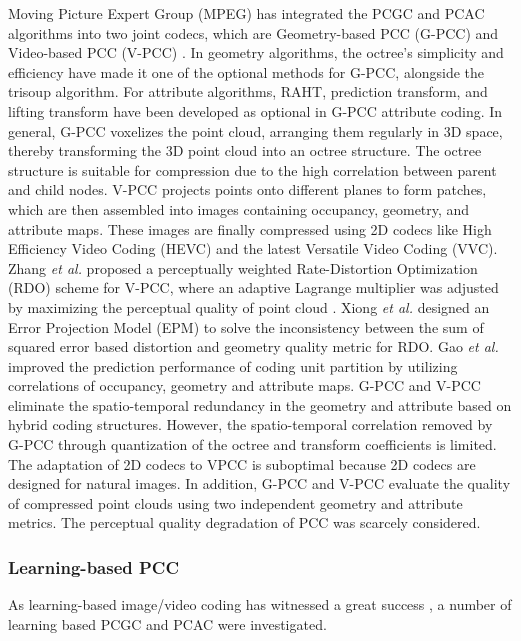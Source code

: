 Moving Picture Expert Group (MPEG) has integrated the PCGC and PCAC algorithms into two joint codecs, which are Geometry-based PCC (G-PCC) \cite{mammou2019g} and Video-based PCC (V-PCC) \cite{mammou2017video}. In geometry algorithms, the octree's simplicity and efficiency have made it one of the optional methods for G-PCC, alongside the trisoup algorithm. For attribute algorithms, RAHT, prediction transform, and lifting transform have been developed as optional in G-PCC attribute coding. In general, G-PCC voxelizes the point cloud, arranging them regularly in 3D space, thereby transforming the 3D point cloud into an octree structure. The octree structure is suitable for compression due to the high correlation between parent and child nodes.
V-PCC projects points onto different planes to form patches, which are then assembled into images containing occupancy, geometry, and attribute maps. These images are finally compressed using 2D codecs like High Efficiency Video Coding (HEVC) and the latest Versatile Video Coding (VVC).
Zhang \textit{et al.} \cite{zhang2023perceptually} proposed a perceptually weighted Rate-Distortion Optimization (RDO) scheme for V-PCC, where an adaptive Lagrange multiplier was adjusted by maximizing the perceptual quality of point cloud \cite{wu2021subjective}. Xiong \textit{et al.} \cite{9735359} designed an Error Projection Model (EPM) to solve the inconsistency between the sum of squared error based distortion and geometry quality metric for RDO. Gao \textit{et al.} \cite{10345479} improved the prediction  performance of coding unit partition by utilizing correlations of occupancy, geometry and attribute maps.
G-PCC and V-PCC eliminate the spatio-temporal redundancy in the geometry and attribute based on hybrid coding structures. However, the spatio-temporal correlation removed by G-PCC through quantization of the octree and transform coefficients is limited. The adaptation of 2D codecs to VPCC is suboptimal because 2D codecs are designed for natural images. In addition, G-PCC and V-PCC evaluate the quality of compressed point clouds using two independent geometry and attribute metrics. The perceptual quality degradation of PCC was scarcely considered.

\subsubsection{Learning-based PCC}
			
As learning-based image/video coding has witnessed a great success \cite{12,134545124,9360626}, a number of learning based PCGC and PCAC \cite{10380494,12351243} were investigated.


